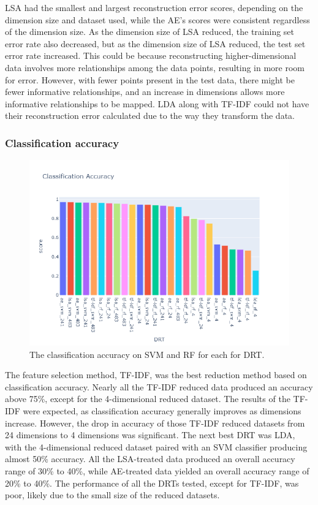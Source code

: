 \documentclass[12pt]{article}
\begin{document}
LSA had the smallest and largest reconstruction error scores, depending on the dimension size and dataset used, while the AE's scores were consistent regardless of the dimension size. As the dimension size of LSA reduced, the training set error rate also decreased, but as the dimension size of LSA reduced, the test set error rate increased. This could be because reconstructing higher-dimensional data involves more relationships among the data points, resulting in more room for error. However, with fewer points present in the test data, there might be fewer informative relationships, and an increase in dimensions allows more informative relationships to be mapped. LDA along with TF-IDF could not have their reconstruction error calculated due to the way they transform the data.

\subsubsection{Classification accuracy}

\begin{figure}[H]
  \centering
  \includegraphics[scale=0.60]{plots/ca.png}
  \caption{The classification accuracy on SVM and RF for each for DRT.}
\end{figure}

\hspace{\parindent} The feature selection method, TF-IDF, was the best reduction method based on classification accuracy. Nearly all the TF-IDF reduced data produced an accuracy above 75\%, except for the 4-dimensional reduced dataset. The results of the TF-IDF were expected, as classification accuracy generally improves as dimensions increase. However, the drop in accuracy of those TF-IDF reduced datasets from 24 dimensions to 4 dimensions was significant. The next best DRT was LDA, with the 4-dimensional reduced dataset paired with an SVM classifier producing almost 50\% accuracy. All the LSA-treated data produced an overall accuracy range of 30\% to 40\%, while AE-treated data yielded an overall accuracy range of 20\% to 40\%. The performance of all the DRTs tested, except for TF-IDF, was poor, likely due to the small size of the reduced datasets.
\end{document}
